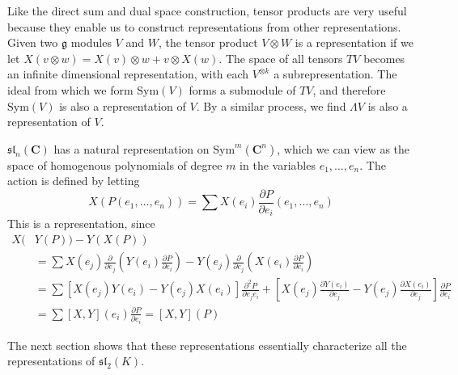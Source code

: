 Like the direct sum and dual space construction, tensor products are very useful because they enable us to construct representations from other representations. Given two $\mathfrak{g}$ modules $V$ and $W$, the tensor product $V \otimes W$ is a representation if we let $X(v \otimes w) = X(v) \otimes w + v \otimes X(w)$. The space of all tensors $TV$ becomes an infinite dimensional representation, with each $V^{\otimes k}$ a subrepresentation. The ideal from which we form $\text{Sym}(V)$ forms a submodule of $TV$, and therefore $\text{Sym}(V)$ is also a representation of $V$. By a similar process, we find $\Lambda V$ is also a representation of $V$.

\begin{example}
    $\mathfrak{sl}_n(\mathbf{C})$ has a natural representation on $\text{Sym}^m(\mathbf{C}^n)$, which we can view as the space of homogenous polynomials of degree $m$ in the variables $e_1, \dots, e_n$. The action is defined by letting
    \[ X\left( P(e_1, \dots, e_n) \right) = \sum X(e_i) \frac{\partial P}{\partial e_i}(e_1, \dots, e_n) \]
    This is a representation, since
    \begin{align*}
        X(&Y(P)) - Y(X(P))\\
        &= \sum X(e_j) \frac{\partial}{\partial e_j} \left( Y(e_i) \frac{\partial P}{\partial e_i} \right) - Y(e_j) \frac{\partial}{\partial e_j} \left( X(e_i) \frac{\partial P}{\partial e_i} \right)\\
        &= \sum [X(e_j) Y(e_i) - Y(e_j) X(e_i)] \frac{\partial^2 P}{\partial e_j e_i} + \left[ X(e_j) \frac{\partial Y(e_i)}{\partial e_j} - Y(e_j) \frac{\partial X(e_i)}{\partial e_j} \right] \frac{\partial P}{\partial e_i}\\
        &= \sum [X,Y](e_i) \frac{\partial P}{\partial e_i} = [X,Y](P)
    \end{align*}
\end{example}

The next section shows that these representations essentially characterize all the representations of $\mathfrak{sl}_2(K)$.




























